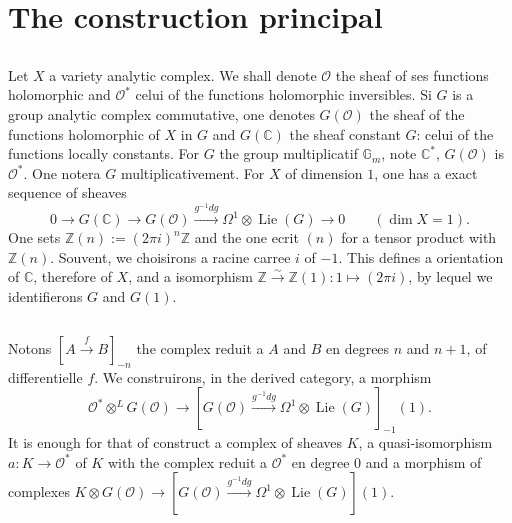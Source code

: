 \documentclass[12pt,a4paper]{article}
\theoremstyle{plain}
\theoremstyle{definition}
\theoremstyle{remark}
\newcommand{\cO}{\mathcal{O}}
\newcommand{\Z}{\mathbb{Z}}
\newcommand{\C}{\mathbb{C}}
\newcommand{\Gm}{\mathbb{G}_m}
\providecommand{\Gm}{\mathbb{G}_{\mathrm m}}
\providecommand{\cO}{\mathcal{O}}
\begin{document}
\section{The construction principal}

\subsection{}

Let $X$ a variety analytic complex. We shall denote $\cO$ the sheaf of ses
functions holomorphic and $\cO^*$ celui of the functions holomorphic inversibles. Si $G$ is a
group analytic complex commutative, one denotes $G(\cO)$ the sheaf of the functions holomorphic of $X$ in $G$ and $G(\C)$ the sheaf constant $G$: celui of the functions locally
constants. For $G$ the group multiplicatif $\Gm$, note $\C^*$, $G(\cO)$ is $\cO^*$. One notera $G$
multiplicativement. For $X$ of dimension $1$, one has a exact sequence of sheaves
\begin{equation}\label{eq:2.1.1}
0 \to G(\C) \to G(\cO) \xrightarrow{g^{-1}dg} \Omega^1 \otimes \operatorname{Lie}(G) \to 0
\qquad (\dim X = 1).
\end{equation}
One sets $\Z(n) := (2\pi i)^n\Z$ and the one ecrit $(n)$ for a tensor product with $\Z(n)$. Souvent, we choisirons a racine carree $i$ of $-1$. This defines a orientation of $\C$, therefore
of $X$, and a isomorphism $\Z \xrightarrow{\sim} \Z(1) : 1 \mapsto (2\pi i)$, by lequel we identifierons $G$ and $G(1)$.

\subsection{}

Notons $[A \xrightarrow{f} B]_{-n}$ the complex reduit a $A$ and $B$ en degrees $n$ and $n+1$,
of differentielle $f$. We construirons, in the derived category, a morphism
\begin{equation}\label{eq:2.2.1}
\cO^* \otimes^L G(\cO) \to [G(\cO) \xrightarrow{g^{-1}dg} \Omega^1 \otimes \operatorname{Lie}(G)]_{-1}(1).
\end{equation}
It is enough for that of construct a complex of sheaves $K$, a quasi-isomorphism
$a : K \to \cO^*$ of $K$ with the complex reduit a $\cO^*$ en degree $0$ and a morphism of complexes
$K \otimes G(\cO) \to [G(\cO) \xrightarrow{g^{-1}dg} \Omega^1 \otimes \operatorname{Lie}(G)](1)$.
\end{document}
